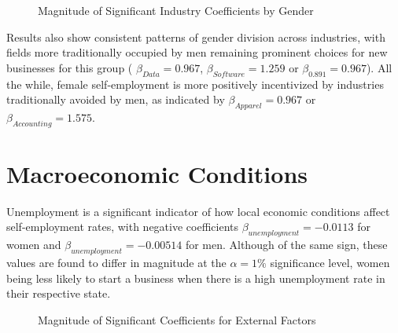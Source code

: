 \begin{figure}[hbtp]
    \caption{Magnitude of Significant Industry Coefficients by Gender} 
\end{figure}

Results also show consistent patterns of gender division across industries, with fields more traditionally occupied by men remaining prominent choices for new businesses for this group ( $\beta_{Data} = 0.967$, $\beta_{Software} = 1.259$ or $\beta_{0.891} = 0.967$). All the while, female self-employment is more positively incentivized by industries traditionally avoided by men, as indicated by $\beta_{Apparel} = 0.967$ or $\beta_{Accounting} = 1.575$.

\section{Macroeconomic Conditions}

Unemployment is a significant indicator of how local economic conditions affect self-employment rates, with negative coefficients $\beta_{unemployment} = -0.0113$ for women and $\beta_{unemployment} = -0.00514$ for men. Although of the same sign, these values are found to differ in magnitude at the $\alpha = 1\% $ significance level, women being less likely to start a business when there is a high unemployment rate in their respective state. 

\begin{figure}[hbtp]
    \caption{Magnitude of Significant Coefficients for External Factors} 
\end{figure}

